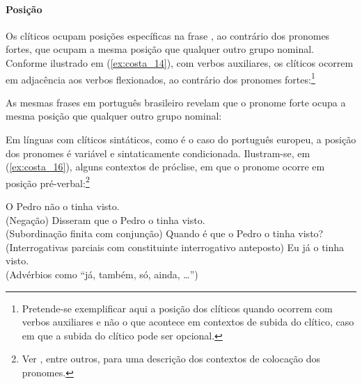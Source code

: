 \documentclass[output=paper]{LSP/langsci}
\begin{document}
\ea\label{ex:costa_13}
\zl

\paragraph*{Posição}
Os clíticos ocupam posições específicas na frase \citep{kayne1975,duartematos2000}, ao contrário dos pronomes fortes, que ocupam a mesma posição que qualquer outro grupo nominal. Conforme ilustrado em (\ref{ex:costa_14}), com verbos auxiliares, os clíticos ocorrem em adjacência aos verbos flexionados, ao contrário dos pronomes fortes:\footnote{Pretende-se exemplificar aqui a posição dos clíticos quando ocorrem com verbos auxiliares e não o que acontece em contextos de subida do clítico, caso em que a subida do clítico pode ser opcional.}

\ea\label{ex:costa_14}
\zl

As mesmas frases em português brasileiro revelam que o pronome forte ocupa a mesma posição que qualquer outro grupo nominal:

\ea\label{ex:costa_15}
\zl

Em línguas com clíticos sintáticos, como é o caso do português europeu, a posição dos pronomes é variável e sintaticamente condicionada. Ilustram-se, em (\ref{ex:costa_16}), alguns contextos de próclise, em que o pronome ocorre em posição pré-verbal:\footnote{Ver \citet{duartematos2000}, entre outros, para uma descrição dos contextos de colocação dos pronomes.}

\ea\label{ex:costa_16}
\ea\label{ex:costa_16a} O Pedro não o tinha visto.\\(Negação)
\ex\label{ex:costa_16b} Disseram que o Pedro o tinha visto.\\(Subordinação finita com conjunção)
\ex\label{ex:costa_16c} Quando é que o Pedro o tinha visto?\\(Interrogativas parciais com constituinte interrogativo anteposto)
\ex\label{ex:costa_16d} Eu já o tinha visto.\\(Advérbios como ``já, também, só, ainda, \ldots'')
\zl
\end{document}
